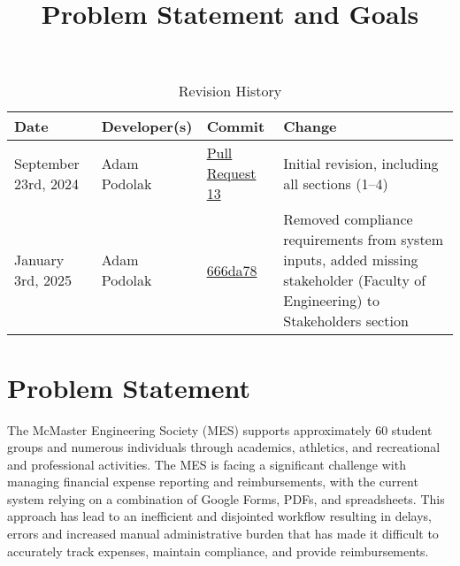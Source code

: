\documentclass{article}
\title{Problem Statement and Goals\\\progname}
\author{\authname}
\date{}
\begin{document}
\maketitle

\begin{table}[htp]
\centering
\caption{Revision History}
\label{TblRevisionHistory}
\begin{tabularx}{\textwidth}{l l l X}
\toprule
\textbf{Date} & \textbf{Developer(s)} & \textbf{Commit} & \textbf{Change}\\

\midrule
September 23rd, 2024 & 
Adam Podolak & 
\href{https://github.com/ausbennett/mes-finance-platform/pull/13}{Pull Request 13} & 
Initial revision, including all sections (1--4)\\

\midrule
January 3rd, 2025 & 
Adam Podolak & 
\href{https://github.com/ausbennett/mes-finance-platform/commit/666da787738895e3392ffbe10d2a7d6c53701e13}{666da78} & Removed compliance requirements from system inputs, added missing stakeholder (Faculty of Engineering) to Stakeholders section \\


\bottomrule
\end{tabularx}
\end{table}

\section{Problem Statement}



The McMaster Engineering Society (MES) supports approximately 60 student groups and numerous individuals through academics, athletics, and recreational and professional activities. The MES is facing a significant challenge with managing financial expense reporting and reimbursements, with the current system relying on a combination of Google Forms, PDFs, and spreadsheets. This approach has lead to an inefficient and disjointed workflow resulting in delays, errors and increased manual administrative burden that has made it difficult to accurately track expenses, maintain compliance, and provide reimbursements. 
\end{document}
